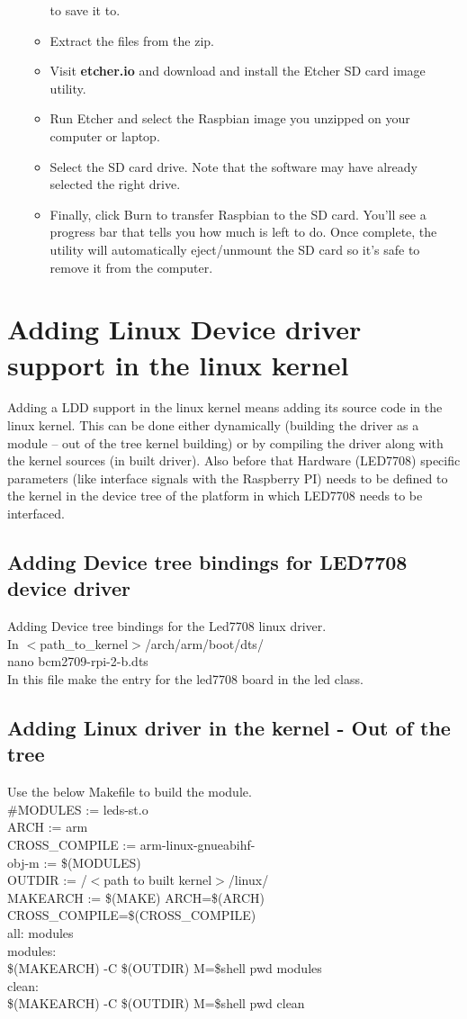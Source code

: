 \begin{enumerate}
\begin{itemize}
		to save it to.
		\item Extract the files from the zip.
		\item Visit \textbf{etcher.io} and download and install the Etcher SD card image utility.
		\item Run Etcher and select the Raspbian image you unzipped on your computer or laptop.
		\item Select the SD card drive. Note that the software may have already selected the right drive.
		\item Finally, click Burn to transfer Raspbian to the SD card. You'll see a progress bar that tells you how
		much is left to do. Once complete, the utility will automatically eject/unmount the SD card so it's safe
		to remove it from the computer.
	\end{itemize}
\end{enumerate}
\section{Adding Linux Device driver support in the linux kernel}
Adding a LDD support in the linux kernel means adding its source code in the linux kernel. This
can be done either dynamically (building the driver as a module – out of the tree kernel
building) or by compiling the driver along with the kernel sources (in built driver). Also before
that Hardware (LED7708) specific parameters (like interface signals with the Raspberry PI)
needs to be defined to the kernel in the device tree of the platform in which LED7708 needs to
be interfaced.
\subsection{Adding Device tree bindings for LED7708 device driver}
Adding Device tree bindings for the Led7708 linux driver.\\
In $<$path\_to\_kernel$>$/arch/arm/boot/dts/\\
nano bcm2709-rpi-2-b.dts\\
In this file make the entry for the led7708 board in the led class.\\
\subsection{Adding Linux driver in the kernel - Out of the tree}
Use the below Makefile to build the module.\\
\#MODULES := leds-st.o\\
ARCH := arm\\
CROSS\_COMPILE := arm-linux-gnueabihf-\\
obj-m := \$(MODULES)\\
OUTDIR := /$<$path to built kernel$>$/linux/\\
MAKEARCH := \$(MAKE) ARCH=\$(ARCH) CROSS\_COMPILE=\$(CROSS\_COMPILE)\\
all: modules\\
modules:\\
\$(MAKEARCH) -C \$(OUTDIR) M=\${shell pwd} modules\\
clean:\\
\$(MAKEARCH) -C \$(OUTDIR) M=\${shell pwd} clean\\
